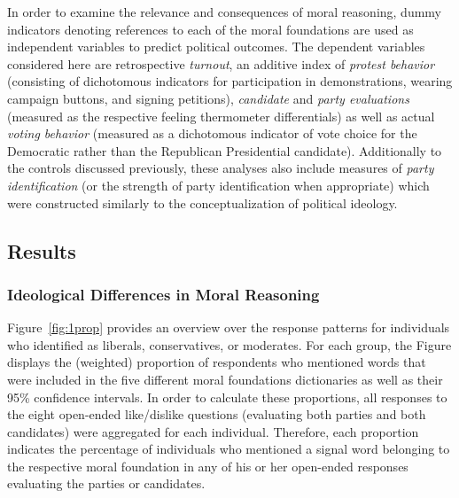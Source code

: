 \documentclass[12pt]{article}
\begin{document}
In order to examine the relevance and consequences of moral reasoning, dummy indicators denoting references to each of the moral foundations are used as independent variables to predict political outcomes. The dependent variables considered here are retrospective \textit{turnout}, an additive index of \textit{protest behavior} (consisting of dichotomous indicators for participation in demonstrations, wearing campaign buttons, and signing petitions), \textit{candidate} and \textit{party evaluations} (measured as the respective feeling thermometer differentials) as well as actual \textit{voting behavior} (measured as a dichotomous indicator of vote choice for the Democratic rather than the Republican Presidential candidate). Additionally to the controls discussed previously, these analyses also include measures of \textit{party identification} (or the strength of party identification when appropriate) which were constructed similarly to the conceptualization of political ideology.


\subsection{Results}

\subsubsection{Ideological Differences in Moral Reasoning}

Figure~\ref{fig:1prop} provides an overview over the response patterns for individuals who identified as liberals, conservatives, or moderates. For each group, the Figure displays the (weighted) proportion of respondents who mentioned words that were included in the five different moral foundations dictionaries as well as their 95\% confidence intervals. In order to calculate these proportions, all responses to the eight open-ended like/dislike questions (evaluating both parties and both candidates) were aggregated for each individual. Therefore, each proportion indicates the percentage of individuals who mentioned a signal word belonging to the respective moral foundation in any of his or her open-ended responses evaluating the parties or candidates.
\end{document}
